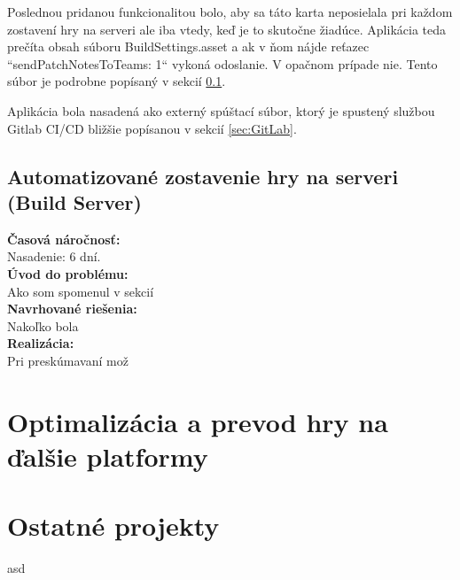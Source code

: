 \documentclass[slovak,bachelorpractice]{diploma}
\begin{document}
Poslednou pridanou funkcionalitou bolo, aby sa táto karta neposielala pri každom zostavení hry na serveri ale iba vtedy, keď je to skutočne žiadúce. Aplikácia teda prečíta obsah súboru BuildSettings.asset a ak v ňom nájde reťazec ``sendPatchNotesToTeams: 1`` vykoná odoslanie. V opačnom prípade nie. Tento súbor je podrobne popísaný v sekcií \ref{sec:BuildServer}.

Aplikácia bola nasadená ako externý spúštací súbor, ktorý je spustený službou Gitlab CI/CD bližšie popísanou v sekcií \ref{sec:GitLab}.
\subsection{Automatizované zostavenie hry na serveri (Build Server)}
\label{sec:BuildServer}
\textbf{Časová náročnosť:} \\ Nasadenie: 6 dní.\\
\textbf{Úvod do problému:} \\ Ako som spomenul v sekcií \\
\textbf{Navrhované riešenia:} \\ Nakoľko bola \\
\textbf{Realizácia:} \\ Pri preskúmavaní mož
\section{Optimalizácia a prevod hry na ďalšie platformy}
\label{sec:Port}
\section{Ostatné projekty}
\label{sec:Others}
asd



\printbibliography[title={Literatúra}, heading=bibintoc]
\end{document}
